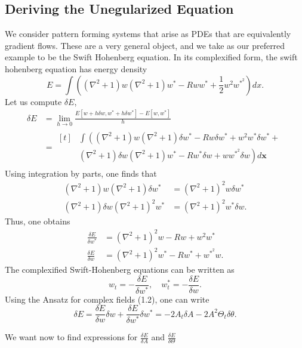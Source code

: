 \documentclass[12pt]{article}
\numberwithin{equation}{section}
\begin{document}
\subsection{Deriving the Unegularized Equation}
\par We consider pattern forming systems that arise as PDEs that are equivalently gradient flows. These are a very general object, and we take as our preferred example to be the Swift Hohenberg equation. In its complexified form, the swift hohenberg equation has energy density
\begin{equation}
    E = \int \left( (\nabla^2+1)w(\nabla^2+1)w^{*}-Rww^{*}+\frac{1}{2}w^2w^{*^2}\right)dx.
\end{equation}
Let us compute $\delta E$,
\begin{align*}
    \delta E &= \lim_{h \rightarrow 0}\frac{E[w+h\delta w, w^* + h\delta w^*]-E[w,w^*]}{h}\\
        &= \begin{aligned}[t]
            & \int \left( (\nabla^2+1)w(\nabla^2+1)\delta w^* -Rw\delta w^* + w^2w^*\delta w^* + \right. \\
            & \left. (\nabla^2+1)\delta w (\nabla^2+1)w^* -Rw^*\delta w + ww^{*^2}\delta w \right) d\bm{x}    
        \end{aligned}
\end{align*}
Using integration by parts, one finds that
\begin{align*}
    (\nabla^2+1)w(\nabla^2+1)\delta w^* &= (\nabla^2 +1)^2w\delta w^*\\
    (\nabla^2+1)\delta w (\nabla^2+1)^2w^* &= (\nabla^2+1)^2w^*\delta w.
\end{align*}
Thus, one obtains
\begin{align}
    \frac{\delta E}{\delta w^*} &= (\nabla^2+1)^2w - Rw + w^2w^*\\
    \frac{\delta E}{\delta w} &= (\nabla^2+1)^2 w^* -Rw^* + w^{*^2}w.
\end{align} 
The complexified Swift-Hohenberg equations can be written as
\begin{equation}
    w_t = - \frac{\delta E}{\delta w^*}, \quad w^*_t = -\frac{\delta E}{\delta w}.
\end{equation}
Using the Ansatz for complex fields (1.2), one can write
\begin{equation}
    \delta E = \frac{\delta E}{\delta w}\delta w + \frac{\delta E}{\delta w^*}\delta w^* = -2A_t\delta A - 2A^2\Theta_t \delta \theta.
\end{equation}
\par We want now to find expressions for $\frac{\delta E}{\delta A}$ and $\frac{\delta E}{\delta \Theta}$
\end{document}
